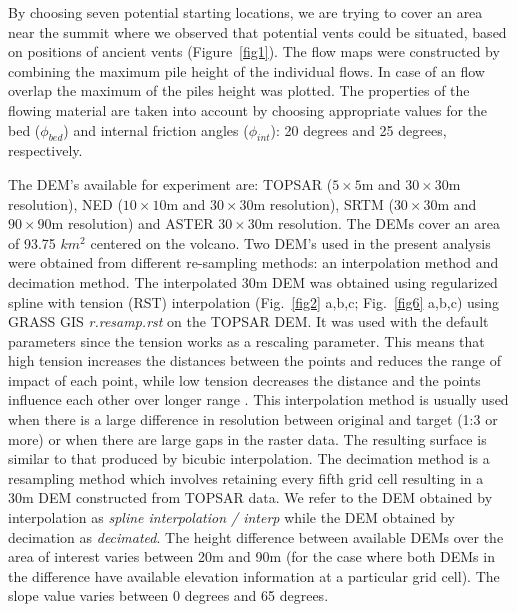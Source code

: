 \documentclass[12pt,letterpaper]{article}
\begin{document}
By choosing seven potential starting locations, we are trying to cover
an area near the summit where we observed that potential vents could
be situated, based on positions of ancient vents \citep{Bailey1989,
Burkett2007} (Figure~\ref{fig1}). The flow maps were constructed by combining
the maximum pile height of the individual flows. In case of an flow overlap
the maximum of the piles height was plotted. The properties of the flowing
material are taken into account by choosing appropriate values for the
bed ($\phi_{bed}$) and internal friction angles ($\phi_{int}$): 20
degrees and 25 degrees, respectively.

The DEM's available for experiment are: TOPSAR ($5 \times 5$m and $30
\times 30$m resolution), NED ($10 \times 10$m and $30 \times 30$m
resolution), SRTM ($30 \times 30$m and $90 \times 90$m resolution) and
ASTER $30 \times 30$m resolution. The DEMs cover an area of 93.75
$km^{2}$ centered on the volcano. Two DEM's used in the present analysis 
 were obtained from
  different re-sampling methods: an interpolation method and
  decimation method.  The interpolated 30m DEM was obtained using
  regularized spline with tension (RST) interpolation (Fig.~\ref{fig2}
  a,b,c; Fig.~\ref{fig6} a,b,c) using GRASS GIS \textit{r.resamp.rst} on the 
  TOPSAR DEM.
  It was used with the default parameters since the tension works
  as a rescaling parameter. This means that high tension increases the
 distances between the points and reduces the range of impact of each
 point, while low tension decreases the distance and the points influence 
 each other over longer range \citep{Cebecauer2002}.
  This interpolation method is usually used when there is a large difference 
  in resolution between original and target (1:3 or more) or when there are large
  gaps in the raster data.  The resulting surface is similar to that
  produced by bicubic interpolation.
  The decimation method is a
  resampling method which involves retaining every fifth grid cell
  resulting in a 30m DEM constructed from TOPSAR data. 
  We refer to the DEM obtained by interpolation as \textit{spline interpolation /
    interp} while the DEM obtained by decimation as
  \textit{decimated}. The height difference between available DEMs over the 
 area of interest varies between 20m and 90m (for the case where both 
 DEMs in the difference have available elevation information at a particular 
 grid cell). The slope value varies between 0 degrees and 65 degrees.
\end{document}
